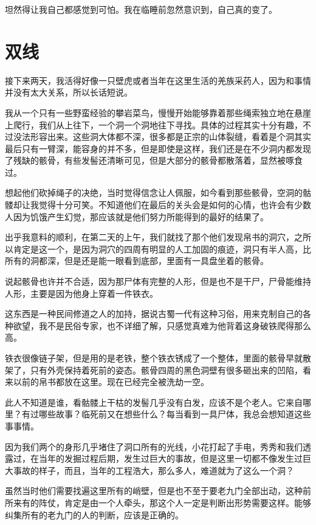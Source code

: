 坦然得让我自己都感觉到可怕。我在临睡前忽然意识到，自己真的变了。

\chapter{双线}

接下来两天，我活得好像一只壁虎或者当年在这里生活的羌族采药人，因为和事情并没有太大关系，所以长话短说。

我从一个只有一些野蛮经验的攀岩菜鸟，慢慢开始能够靠着那些绳索独立地在悬崖上爬行，我们从上往下，一个洞一个洞地往下寻找。具体的过程其实十分有趣，不过没法形容出来。这些洞大体都不深，很多都是正宗的山体裂缝，看着是个洞其实最后只有一臂深，能容身的并不多，但是即使是这样，我们还是在不少洞内都发现了残缺的骸骨，有些发髻还清晰可见，但是大部分的骸骨都散落着，显然被啄食过。

想起他们砍掉绳子的决绝，当时觉得信念让人佩服，如今看到那些骸骨，空洞的骷髅却让我觉得十分可笑。不知道他们在最后的关头会是如何的心情，也许会有少数人因为饥饿产生幻觉，那应该就是他们努力所能得到的最好的结果了。

出乎我意料的顺利，在第二天的上午，我们就找了那个他们发现帛书的洞穴，之所以肯定是这一个，是因为洞穴的四周有明显的人工加固的痕迹，洞只有半人高，比所有的洞都深，但是还是能一眼看到底部，里面有一具盘坐着的骸骨。

说起骸骨也许并不合适，因为那尸体有完整的人形，但是也不是干尸，尸骨能维持人形，主要是因为他身上穿着一件铁衣。

这东西是一种民间修道之人的加持，据说古蜀一代有这种习俗，用来克制自己的各种欲望，我不是民俗专家，也不详细了解，只感觉真难为他背着这身破铁爬得那么高。

铁衣很像链子架，但是用的是老铁，整个铁衣锈成了一个整体，里面的骸骨早就散架了，只有外壳保持着死前的姿态。骸骨四周的黑色洞壁有很多砸出来的凹陷，看来以前的帛书都放在这里。现在已经完全被洗劫一空。

此人不知道是谁，看骷髅上干枯的发髻几乎没有白发，应该不是个老人。它来自哪里？有过哪些故事？临死前又在想些什么？每当看到一具尸体，我总会想知道这些事事情。

因为我们两个的身形几乎堵住了洞口所有的光线，小花打起了手电，秀秀和我们透露过，在当年的发掘过程后期，发生过巨大的事故，但是这里一切都不像发生过巨大事故的样子，而且，当年的工程浩大，那么多人，难道就为了这么一个洞？

虽然当时他们需要找遍这里所有的峭壁，但是也不至于要老九门全部出动，这种前所来有的阵仗，肯定是由一个人牵头，那这个人一定是判断出形势需要这样。能够纠集所有的老九门的人的判断，应该是正确的。

